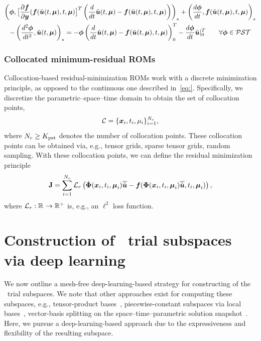 \documentclass[3p,computermodern,10pt]{elsarticle}
\begin{document}
 \begin{multline}\label{eq:ROM_normal2}
\left(  \boldsymbol \phi,  \big[\frac{\partial \boldsymbol f}{\partial \boldsymbol y}(  \boldsymbol f(\tilde{\boldsymbol u}(t,\boldsymbol \mu),t,\boldsymbol \mu)  \big]^T  \left( \frac{d}{dt} \tilde{\boldsymbol u}(t,\boldsymbol \mu)  -   \boldsymbol f(\tilde{\boldsymbol u}(t,\boldsymbol \mu),t,\boldsymbol \mu) \right) \right)_{*} 
+ \left( \frac{d \boldsymbol \phi}{dt},    \boldsymbol f(\tilde{\boldsymbol u}(t,\boldsymbol \mu),t,\boldsymbol \mu)   \right)_{*} \\
- \left( \frac{d^2 \boldsymbol \phi}{dt^2},   \tilde{\boldsymbol u}(t,\boldsymbol \mu) \right)_{*} 
 =  
-  \boldsymbol \phi \left( \frac{d}{dt} \tilde{\boldsymbol u}(t,\boldsymbol \mu)   - \boldsymbol f(\tilde{\boldsymbol u}(t,\boldsymbol \mu),t,\boldsymbol \mu) \right)_0^T - \frac{d \boldsymbol \phi}{dt}\tilde{\boldsymbol u}|_0^T \qquad \forall \boldsymbol \phi \in \mathcal{PST}
\end{multline} 

\subsubsection{Collocated minimum-residual ROMs}
Collocation-based residual-minimization ROMs work with a discrete minimization principle, as opposed to the continuous one described in~\eqref{eq:}. Specifically, we discretize the parametric--space--time domain to obtain the set of collocation points, 
$$\mathcal{C} = \{ \boldsymbol x_i,t_i,\mu_i\}_{i=1}^{N_c},$$
where $N_c \ge K_{\text{pst}}$ denotes the number of collocation points. These collocation points can be obtained via, e.g., tensor grids, sparse tensor grids, random sampling. With these collocation points, we can define the residual minimization principle 
$$\mathbf{J} = \sum_{i=1}^{N_c} \mathcal{L}_{r}\left( \dot{\boldsymbol \Phi}(\boldsymbol x_i,t_i,\boldsymbol \mu_i)\overline{\hat{\boldsymbol u}} - \boldsymbol f( \boldsymbol \Phi(\boldsymbol x_i,t_i,\boldsymbol \mu_i) \overline{\hat{\boldsymbol u}} ,t_i,\boldsymbol \mu_i) \right),$$
where $\mathcal{L}_{r} : \mathbb{R}^{} \rightarrow \mathbb{R}^{+}$ is, e.g., an $\ell^2$ loss function. 

\section{Construction of \parametricSpaceTimeAcronym\ trial subspaces via deep learning}
We now outline a mesh-free deep-learning-based strategy for constructing of the \parametricSpaceTimeAcronym\ trial subspaces. We note that other approaches exist for computing these subspaces, e.g., tensor-product bases~\cite{choi_stlspg}, piecewise-constant subspaces via local bases~\cite{}, vector-basis splitting on the space--time--parametric solution snapshot~\cite{carlberg_hadaptation,ETTER2020112931}. Here, we pursue a deep-learning-based approach due to the expressiveness and flexibility of the resulting subspace.
\end{document}
